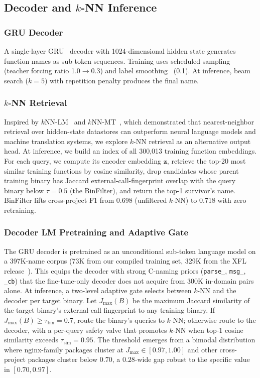 \documentclass[sigconf,nonacm]{acmart}
\begin{document}
\subsection{Decoder and $k$-NN Inference}
\label{sec:decoder}

\subsubsection{GRU Decoder}
A single-layer GRU~\cite{gru} decoder with 1024-dimensional hidden state generates function names as sub-token sequences. Training uses scheduled sampling (teacher forcing ratio 1.0$\to$0.3) and label smoothing~\cite{labelsmooth} (0.1). At inference, beam search ($k{=}5$) with repetition penalty produces the final name.

\subsubsection{$k$-NN Retrieval}
\label{sec:knn}
Inspired by $k$NN-LM~\cite{knnlm} and $k$NN-MT~\cite{knnmt}, which demonstrated that nearest-neighbor retrieval over hidden-state datastores can outperform neural language models and machine translation systems, we explore $k$-NN retrieval as an alternative output head. At inference, we build an index of all 300{,}013 training function embeddings. For each query, we compute its encoder embedding $\mathbf{z}$, retrieve the top-20 most similar training functions by cosine similarity, drop candidates whose parent training binary has Jaccard external-call-fingerprint overlap with the query binary below $\tau{=}0.5$ (the BinFilter), and return the top-1 survivor's name. BinFilter lifts cross-project F1 from 0.698 (unfiltered $k$-NN) to 0.718 with zero retraining.

\subsubsection{Decoder LM Pretraining and Adaptive Gate}
\label{sec:adaptive-gate}
The GRU decoder is pretrained as an unconditional sub-token language model on a 397K-name corpus (73K from our compiled training set, 329K from the XFL release~\cite{xfl}). This equips the decoder with strong C-naming priors (\texttt{parse\_}, \texttt{msg\_}, \texttt{\_cb}) that the fine-tune-only decoder does not acquire from 300K in-domain pairs alone. At inference, a two-level adaptive gate selects between $k$-NN and the decoder per target binary. Let $J_{\max}(B)$ be the maximum Jaccard similarity of the target binary's external-call fingerprint to any training binary. If $J_{\max}(B) \ge \tau_{\text{bin}}{=}0.7$, route the binary's queries to $k$-NN; otherwise route to the decoder, with a per-query safety valve that promotes $k$-NN when top-1 cosine similarity exceeds $\tau_{\text{sim}}{=}0.95$. The threshold emerges from a bimodal distribution where nginx-family packages cluster at $J_{\max} \in [0.97, 1.00]$ and other cross-project packages cluster below $0.70$, a $0.28$-wide gap robust to the specific value in $[0.70, 0.97]$.
\end{document}
